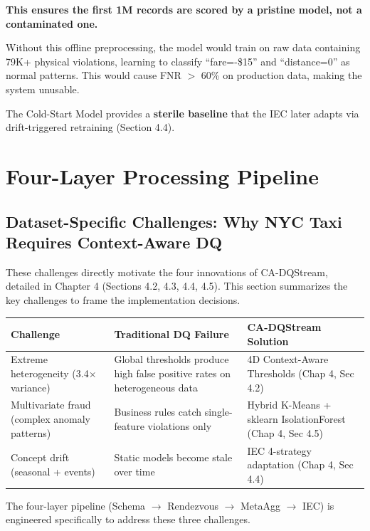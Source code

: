\textbf{This ensures the first 1M records are scored by a pristine model, not a contaminated one.}

Without this offline preprocessing, the model would train on raw data containing 79K+ physical violations, learning to classify ``fare=-\$15'' and ``distance=0'' as normal patterns. This would cause FNR $>$ 60\% on production data, making the system unusable.

The Cold-Start Model provides a \textbf{sterile baseline} that the IEC later adapts via drift-triggered retraining (Section 4.4).

\section{Four-Layer Processing Pipeline}

\subsection{Dataset-Specific Challenges: Why NYC Taxi Requires Context-Aware DQ}

These challenges directly motivate the four innovations of CA-DQStream, detailed in Chapter 4 (Sections 4.2, 4.3, 4.4, 4.5). This section summarizes the key challenges to frame the implementation decisions.

\begin{center}
\begin{tabular}{|m{5cm}|m{5cm}|m{4cm}|}
\hline
\textbf{Challenge} & \textbf{Traditional DQ Failure} & \textbf{CA-DQStream Solution} \\
\hline
Extreme heterogeneity (3.4$\times$ variance) & Global thresholds produce high false positive rates on heterogeneous data & 4D Context-Aware Thresholds (Chap 4, Sec 4.2) \\
\hline
Multivariate fraud (complex anomaly patterns) & Business rules catch single-feature violations only & Hybrid K-Means + sklearn IsolationForest (Chap 4, Sec 4.5) \\
\hline
Concept drift (seasonal + events) & Static models become stale over time & IEC 4-strategy adaptation (Chap 4, Sec 4.4) \\
\hline
\end{tabular}
\end{center}

The four-layer pipeline (Schema $\rightarrow$ Rendezvous $\rightarrow$ MetaAgg $\rightarrow$ IEC) is engineered specifically to address these three challenges.

